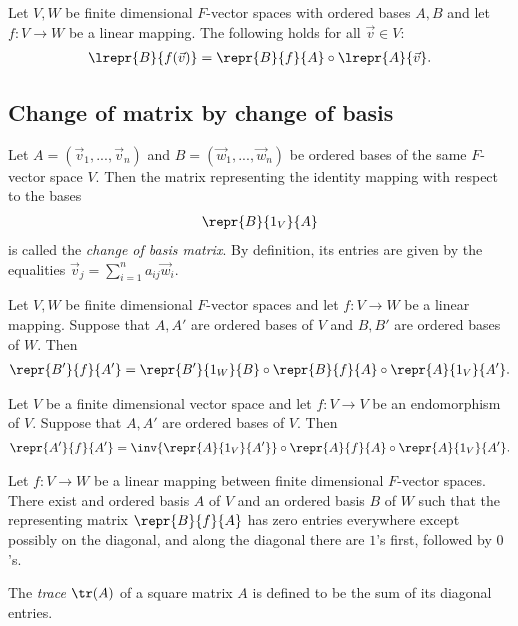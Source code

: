 \documentclass{article}
\begin{document}
\begin{theorem}[Notes 2.3.4]
    Let $V,W$ be finite dimensional $F$-vector spaces with ordered bases $A,B$ and let $f:V\to W$
    be a linear mapping. The following holds for all $\vec v\in V$:
    \begin{align*}
        \lrepr{B}{f(\vec v)}=\repr{B}{f}{A} \circ \lrepr{A}{\vec v}.
    \end{align*}
\end{theorem}

\subsection{Change of matrix by change of basis}

\begin{definition}
    Let $A=(\vec v_1, ...,\vec v_n)$ and $B=(\vec w_1,...,\vec w_n)$ be ordered bases of the same 
    $F$-vector space $V$. Then the matrix representing the identity mapping with respect to the 
    bases 
    \begin{align*}
        \repr{B}{1_V}{A}
    \end{align*}
    is called the \emph{change of basis matrix}. By definition, its entries are given by the 
    equalities $\vec v_j=\sum_{i=1}^n a_{ij}\vec w_i$.
\end{definition}

\begin{theorem}[Notes 2.4.3]
    Let $V,W$ be finite dimensional $F$-vector spaces and let $f:V\to W$ be a linear mapping.
    Suppose that $A,A'$ are ordered bases of $V$ and $B,B'$ are ordered bases of $W$. Then 
    \begin{align*}
        \repr{B'}{f}{A'} = \repr{B'}{1_W}{B}\circ\repr{B}{f}{A}\circ\repr{A}{1_V}{A'}.
    \end{align*} 
\end{theorem}

\begin{corollary}[Notes 2.4.4]
    Let $V$ be a finite dimensional vector space and let $f:V\to V$ be an endomorphism of $V$.
    Suppose that $A,A'$ are ordered bases of $V$. Then 
    \begin{align*}
        \repr{A'}{f}{A'}=\inv{\repr{A}{1_V}{A'}}\circ\repr{A}{f}{A}\circ\repr{A}{1_V}{A'}.
    \end{align*} 
\end{corollary}

\begin{theorem}[Notes 2.4.5]
    Let $f:V\to W$ be a linear mapping between finite dimensional $F$-vector spaces. There exist
    and ordered basis $A$ of $V$ and an ordered basis $B$ of $W$ such that the representing matrix
    $\repr{B}{f}{A}$ has zero entries everywhere except possibly on the diagonal, and along the 
    diagonal there are $1$'s first, followed by $0$'s.
\end{theorem}

\begin{definition}
    The \emph{trace} $\tr(A)$ of a square matrix $A$ is defined to be the sum of its diagonal entries.
\end{definition}
\end{document}
